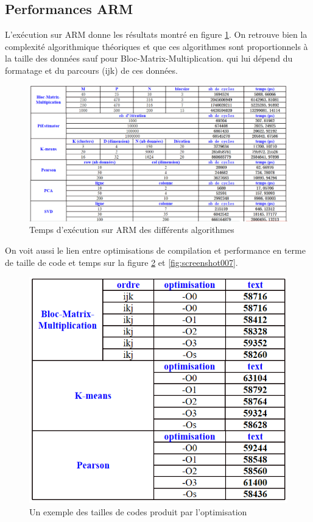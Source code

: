 \documentclass[12pt,a4paper]{article}
\begin{document}
\subsection{Performances ARM}
L'exécution sur ARM donne les résultats montré en figure \ref{fig:screenshot005}. On retrouve bien la complexité algorithmique théoriques et que ces algorithmes sont proportionnels à la taille des données sauf pour Bloc-Matrix-Multiplication. qui lui dépend du formatage et du parcours (ijk) de ces données.
\begin{figure}[H]
	\centering
	\includegraphics[width=\linewidth]{soft/screenshot005}
	\caption {Temps d'exécution sur ARM des différents algorithmes}
	\label{fig:screenshot005}
\end{figure}
On voit aussi le lien entre optimisations de compilation et performance en terme de taille de code et temps sur la figure \ref{fig:screenshot006} et \ref{fig:screenshot007}.
\begin{figure}[H]
	\centering
	\includegraphics[width=0.6\linewidth]{soft/screenshot006}
	\caption{Un exemple des tailles de codes produit par l'optimisation}
	\label{fig:screenshot006}
\end{figure}
\end{document}
